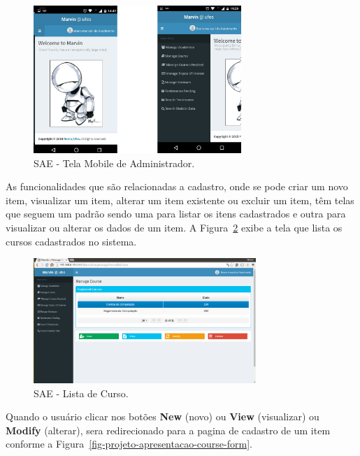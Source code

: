 \begin{figure}[h]
	\centering
	\includegraphics[width=0.7\textwidth]{figuras/projeto/fig-projeto-apresentacao-tela-reponsiva-administrador}
	\caption{SAE - Tela Mobile de Administrador.}
	\label{fig-projeto-apresentacao-tela-reponsiva-administrador}
\end{figure}


As funcionalidades que são relacionadas a cadastro, onde se pode criar um novo item, visualizar um item, alterar um item existente ou excluir um item, têm telas que seguem um padrão sendo uma para listar os itens cadastrados e outra para visualizar ou alterar os dados de um item. A Figura~\ref{fig-projeto-apresentacao-course-list} exibe a tela que lista os cursos cadastrados no sistema.

\begin{figure}[h]
	\centering
	\includegraphics[width=0.75\textwidth]{figuras/projeto/fig-projeto-apresentacao-course-list}
	\caption{SAE - Lista de Curso.}
	\label{fig-projeto-apresentacao-course-list}
\end{figure}


Quando o usuário clicar nos botões \textbf{New} (novo) ou \textbf{View} (visualizar) ou \textbf{Modify} (alterar), sera redirecionado para a pagina de cadastro de um item conforme a Figura~\ref{fig-projeto-apresentacao-course-form}.

